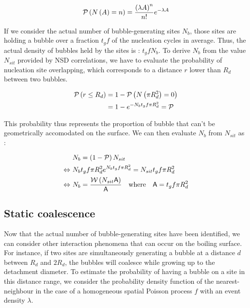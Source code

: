 \begin{align}
\mathcal{P}\left( N\left( A \right)=n \right)=\frac{\left( \lambda A \right)^{n}}{n!}e^{-\lambda A}
\end{align}

If we consider the actual number of bubble-generating sites $N_{b}$, those sites are holding a bubble over a fraction $t_{g}f$ of the nucleation cycles in average. Thus, the actual density of bubbles held by the sites is : $t_{g}f N_{b}$. To derive $N_{b}$ from the value $N_{sit}$ provided by NSD correlations, we have to evaluate the probability of nucleation site overlapping, which corresponds to a distance $r$ lower than $R_{d}$ between two bubbles. 

\begin{align}
\mathcal{P}\left( r\leq R_{d} \right) &=1-\mathcal{P}\left( N\left( \pi R_{d}^{2} \right)=0 \right)\\
&=1-e^{-N_{b}t_{g}f\pi R_{d}^{2}} = \mathcal{P}
\end{align}

This probability thus represents the proportion of bubble that can't be geometrically accomodated on the surface. We can then evaluate $N_{b}$ from $N_ {sit}$ as :

\begin{align}
&N_{b}=\parth{1-\mathcal{P}}N_{sit} \\
%
\Leftrightarrow\  &N_{b}t_{g}f\pi R_{d}^{2}e^{N_{b}t_{g}f \pi R_{d}^{2}}= N_{sit}t_{g}f \pi R_{d}^{2} \\
%
\Leftrightarrow\   &N_{b} = \frac{\mathcal{W}\parth{N_{sit}\mathsf{A}}}{\mathsf{A}}\ \ \ \text{where}\ \ \ \mathsf{A}=t_{g}f\pi R_{d}^{2}
\end{align}



\subsection{Static coalescence}

Now that the actual number of bubble-generating sites have been identified, we can consider other interaction phenomena that can occur on the boiling surface. For instance, if two sites are simultaneously generating a bubble at a distance $d$ between $R_{d}$ and $2R_{d}$, the bubbles will coalesce while growing up to the detachment diameter. To estimate the probability of having a bubble on a site in this distance range, we consider the probability density function of the nearest-neighbour in the case of a homogeneous spatial Poisson process $f$ with an event density $\lambda$. 


